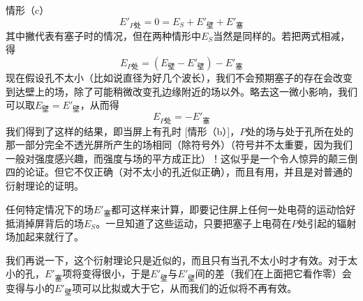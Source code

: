 情形（c）
\begin{equation*}
    E'_{P\text{处}}=0=E_S+E'_\text{壁}+E'_\text{塞}
\end{equation*}
其中撇代表有塞子时的情况，但在两种情形中$E_S$当然是同样的。若把两式相减，得
\begin{equation*}
    E_{P\text{处}}=(E_\text{壁} - E'_\text{壁})-E'_\text{塞}
\end{equation*}
现在假设孔不太小（比如说直径为好几个波长），我们不会预期塞子的存在会改变到达壁上的场，除了可能稍微改变孔边缘附近的场以外。略去这一微小影响，我们可以取$E_\text{壁}=E'_\text{壁}$，从而得
\begin{equation*}
    E_{P\text{处}}=-E'_\text{塞}
\end{equation*}
我们得到了这样的结果，即当屏上有孔时 [情形（b）]，$P$处的场与处于孔所在处的那一部分完全不透光屏所产生的场相同（除符号外）（符号并不太重要，因为我们一般对强度感兴趣，而强度与场的平方成正比）！这似乎是一个令人惊异的颠三倒四的论证。但它不仅正确（对不太小的孔近似正确），而且有用，并且是对普通的衍射理论的证明。

任何特定情况下的场$E'_\text{塞}$都可这样来计算，即要记住屏上任何一处电荷的运动恰好抵消掉屏背后的场$E_S$。一旦知道了这些运动，只要把塞子上电荷在$P$处引起的辐射场加起来就行了。

我们再说一下，这个衍射理论只是近似的，而且只有当孔不太小时才有效。对于太小的孔，$E'_\text{塞}$项将变得很小，于是$E'_\text{壁}$与$E'_\text{壁}$间的差（我们在上面把它看作零）会变得与小的$E'_\text{壁}$项可以比拟或大于它，从而我们的近似将不再有效。